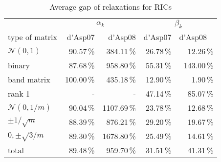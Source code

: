 \begin{table} 
 \begin{scriptsize} \caption{Average gap of relaxations for RICs} 
 \label{lhsRhsGap} 
 \begin{tabular*}{\linewidth}{@{}l@{\;\;\extracolsep{\fill}}rrrr@{}}\toprule 
  & \multicolumn{2}{c}{$\alpha_k$} & \multicolumn{2}{c}{$\beta_k$} \\ 
\cmidrule(r){2-3} \cmidrule(l){4-5} 
type of matrix & d'Asp07 & d'Asp08 & d'Asp07 & d'Asp08 \ 
\\ \midrule 
$\mathcal{N}(0,1)$ & \num{90.57}\,\% & \num{384.11}\,\% & \num{26.78}\,\% & \num{12.26}\,\% \\ 
binary & \num{87.68}\,\% & \num{958.80}\,\% & \num{55.31}\,\% & \num{143.00}\,\% \\ 
band matrix & \num{100.00}\,\% & \num{435.18}\,\% & \num{12.90}\,\% & \num{1.90}\,\% \\ 
rank 1& - &- & \num{47.14}\,\% & \num{85.07}\,\% \\ 
$\mathcal{N}(0,1/m)$ & \num{90.04}\,\% & \num{1107.69}\,\% & \num{23.78}\,\% & \num{12.68}\,\% \\ 
$\pm 1/\sqrt{m}$ & \num{88.39}\,\% & \num{876.21}\,\% & \num{29.20}\,\% & \num{19.67}\,\% \\ 
$0, \pm \sqrt{3/m}$ & \num{89.30}\,\% & \num{1678.80}\,\% & \num{25.49}\,\% & \num{14.61}\,\% \\ 
\midrule 
total &  \num{89.48}\,\% & \num{959.70}\,\% & \num{31.51}\,\% & \num{41.31}\,\%\\ 
\bottomrule 
 \end{tabular*} 
 \end{scriptsize} 
 \end{table} 